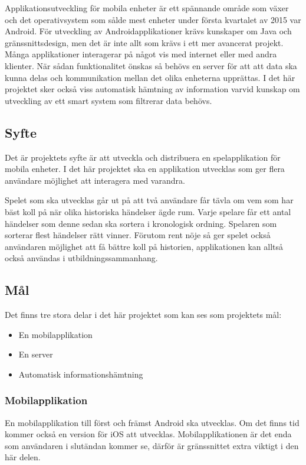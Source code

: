 \documentclass[swedish,12pt,a4paper]{article}
\begin{document}
Applikationsutveckling för mobila enheter är ett spännande område som växer\cite{trendforce} och det operativsystem som sålde mest enheter under första kvartalet av 2015 var Android. För utveckling av Androidapplikationer krävs kunskaper om Java och gränssnittsdesign, men det är inte allt som krävs i ett mer avancerat projekt. Många applikationer interagerar på något vis med internet eller med andra klienter. När sådan funktionalitet önskas så behövs en server för att att data ska kunna delas och kommunikation mellan det olika enheterna upprättas. I det här projektet sker också viss automatisk hämtning av information varvid kunskap om utveckling av ett smart system som filtrerar data behövs.


\subsection{Syfte}
Det är projektets syfte är att utveckla och distribuera en spelapplikation för mobila enheter. I det här projektet ska en applikation utvecklas som ger flera användare möjlighet att interagera med varandra.

Spelet som ska utvecklas går ut på att två användare får tävla om vem som har bäst koll på när olika historiska händelser ägde rum. Varje spelare får ett antal händelser som denne sedan ska sortera i kronologisk ordning. Spelaren som sorterar flest händelser rätt vinner. Förutom rent nöje så ger spelet också användaren möjlighet att få bättre koll på historien, applikationen kan alltså också användas i utbildningssammanhang.

\subsection{Mål}
Det finns tre stora delar i det här projektet som kan ses som projektets mål:
\begin{itemize}
\item En mobilapplikation
\item En server
\item Automatisk informationshämtning
\end{itemize}

\subsubsection{Mobilapplikation}
En mobilapplikation till först och främst Android ska utvecklas. Om det finns tid kommer också en version för iOS att utvecklas. Mobilapplikationen är det enda som användaren i slutändan kommer se, därför är gränssnittet extra viktigt i den här delen. 
\end{document}
